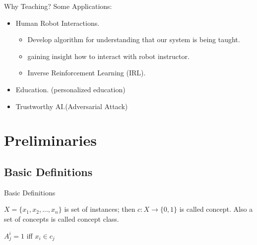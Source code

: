 \documentclass{beamer}
\begin{document}
\begin{frame}{Why Teaching?}
    Some Applications:
    \begin{itemize}
        \item Human Robot Interactions. 
        \begin{itemize}
            \item Develop algorithm for understanding that our system is being taught.
            \item gaining insight how to interact with robot instructor.
            \item Inverse Reinforcement Learning (IRL).
        \end{itemize}
        
        \item Education. (personalized education) %
        \item Trustworthy AI.(Adversarial Attack) %
        
    \end{itemize}
\end{frame}


\section{Preliminaries}
\subsection{Basic Definitions}

\begin{frame}{Basic Definitions}
    \begin{definition}
    $X = \{x_1, x_2, ..., x_n\}$ is set of instances; then $c:X\rightarrow\{0,1\}$ is called concept. Also a set of concepts is called concept class.
\end{definition}

\begin{definition}
$A_j^i = 1$ iff $x_i \in c_j$
\end{definition}



\end{frame}
\end{document}
